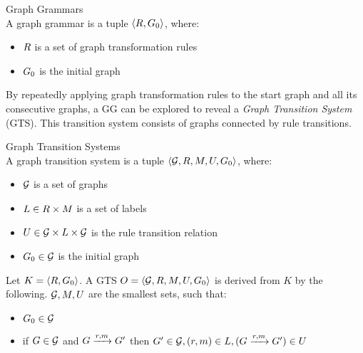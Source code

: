 \vspace{5px}
\begin{definition} Graph Grammars \\
A graph grammar is a tuple $\langle R, G_0 \rangle$, where:
\begin{itemize}
\item $R$ is a set of graph transformation rules
\item $G_0$ is the initial graph
\end{itemize}
\end{definition}
\vspace{5px}

By repeatedly applying graph transformation rules to the start graph and all its consecutive graphs, a GG can be explored to reveal a \textit{Graph Transition System} (GTS). This transition system consists of graphs connected by rule transitions.

\vspace{5px}
\begin{definition} Graph Transition Systems \\
A graph transition system is a tuple	$\langle \mathcal{G}, R, M, U, G_0\rangle$, where:
\begin{itemize}
\item $\mathcal{G}$ is a set of graphs
\item $L \in R \times M$ is a set of labels
\item $U \in \mathcal{G} \times L \times \mathcal{G}$ is the rule transition relation
\item $G_0 \in \mathcal{G}$ is the initial graph
\end{itemize}
\end{definition}
\vspace{5px}

Let $K = \langle R, G_0 \rangle$. A GTS $O = \langle \mathcal{G}, R, M, U, G_0\rangle$ is derived from $K$ by the following. $\mathcal{G}, M, U$ are the smallest sets, such that:
\begin{itemize}
\item $G_0 \in \mathcal{G}$
\item if $G \in \mathcal{G}$ and $G \xrightarrow{r, m}G'$ then $G' \in \mathcal{G}, (r, m) \in L, (G \xrightarrow{r, m}G') \in U$
\end{itemize}

